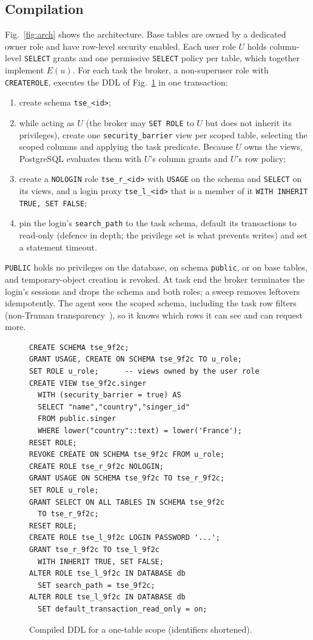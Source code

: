 \subsection{Compilation}
Fig.~\ref{fig:arch} shows the architecture. Base tables are owned by a dedicated owner role and have row-level
security enabled. Each user role $U$ holds column-level \texttt{SELECT} grants and one permissive \texttt{SELECT}
policy per table, which together implement $E(u)$. For each task the broker, a non-superuser role with
\texttt{CREATEROLE}, executes the DDL of Fig.~\ref{lst:ddl} in one transaction:
\begin{enumerate}
\item create schema \texttt{tse\_<id>};
\item while acting as $U$ (the broker may \texttt{SET ROLE} to $U$ but does not inherit its privileges), create one
\texttt{security\_barrier} view per scoped table, selecting the scoped columns and applying the task predicate.
Because $U$ owns the views, PostgreSQL evaluates them with $U$'s column grants and $U$'s row policy;
\item create a \texttt{NOLOGIN} role \texttt{tse\_r\_<id>} with \texttt{USAGE} on the schema and \texttt{SELECT}
on its views, and a login proxy \texttt{tse\_l\_<id>} that is a member of it \texttt{WITH INHERIT TRUE, SET FALSE};
\item pin the login's \texttt{search\_path} to the task schema, default its transactions to read-only (defence in depth; the privilege set is what prevents writes) and set a statement
timeout.
\end{enumerate}
\texttt{PUBLIC} holds no privileges on the database, on schema \texttt{public}, or on base tables, and
temporary-object creation is revoked. At task end the broker terminates the login's sessions and drops the schema
and both roles; a sweep removes leftovers idempotently. The agent sees the scoped schema, including the task row
filters (non-Truman transparency~\cite{rizvi2004extending}), so it knows which rows it can see and can request
more.

\begin{figure}[t]
\footnotesize
\begin{verbatim}
CREATE SCHEMA tse_9f2c;
GRANT USAGE, CREATE ON SCHEMA tse_9f2c TO u_role;
SET ROLE u_role;      -- views owned by the user role
CREATE VIEW tse_9f2c.singer
  WITH (security_barrier = true) AS
  SELECT "name","country","singer_id"
  FROM public.singer
  WHERE lower("country"::text) = lower('France');
RESET ROLE;
REVOKE CREATE ON SCHEMA tse_9f2c FROM u_role;
CREATE ROLE tse_r_9f2c NOLOGIN;
GRANT USAGE ON SCHEMA tse_9f2c TO tse_r_9f2c;
SET ROLE u_role;
GRANT SELECT ON ALL TABLES IN SCHEMA tse_9f2c
  TO tse_r_9f2c;
RESET ROLE;
CREATE ROLE tse_l_9f2c LOGIN PASSWORD '...';
GRANT tse_r_9f2c TO tse_l_9f2c
  WITH INHERIT TRUE, SET FALSE;
ALTER ROLE tse_l_9f2c IN DATABASE db
  SET search_path = tse_9f2c;
ALTER ROLE tse_l_9f2c IN DATABASE db
  SET default_transaction_read_only = on;
\end{verbatim}
\caption{Compiled DDL for a one-table scope (identifiers shortened).}
\label{lst:ddl}
\end{figure}

